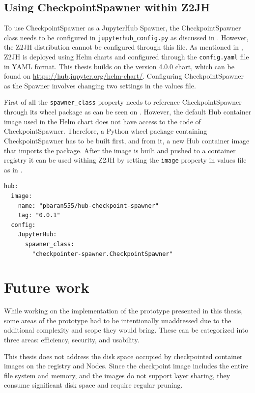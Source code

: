 \documentclass[
  digital,     %
  oneside,     %
  nosansbold,  %
  nocolorbold, %
  lof,         %
  nolot,         %
]{fithesis4}
\newenvironment{code}{\captionsetup{type=listing}}{}
\begin{document}
\section{Using CheckpointSpawner within Z2JH}
To use CheckpointSpawner as a JupyterHub Spawner, the CheckpointSpawner class needs to be configured in \texttt{jupyterhub\_config.py} as discussed in . However, the Z2JH distribution cannot be configured through this file. As mentioned in , Z2JH is deployed using Helm charts and configured through the \texttt{config.yaml} file in YAML format. This thesis builds on the version 4.0.0 chart, which can be found on \url{https://hub.jupyter.org/helm-chart/}. Configuring CheckpointSpawner as the Spawner involves changing two settings in the values file.

First of all the \texttt{spawner\_class} property needs to reference CheckpointSpawner through its wheel package as can be seen on . However, the default Hub container image used in the Helm chart does not have access to the code of CheckpointSpawner. Therefore, a Python wheel package containing CheckpointSpawner has to be built first, and from it, a new Hub container image that imports the package. After the image is built and pushed to a container registry it can be used withing Z2JH by setting the \texttt{image} property in values file as in .


\begin{code}
\label{lst:z2jh:values}
\begin{verbatim}
hub:
  image:
    name: "pbaran555/hub-checkpoint-spawner"
    tag: "0.0.1"
  config:
    JupyterHub:
      spawner_class: 
        "checkpointer-spawner.CheckpointSpawner"
\end{verbatim}
\end{code}




\chapter{Future work}
While working on the implementation of the prototype presented in this thesis, some areas of the prototype had to be intentionally unaddressed due to the additional complexity and scope they would bring. These can be categorized into three areas: efficiency, security, and usability.

This thesis does not address the disk space occupied by checkpointed container images on the registry and Nodes. Since the checkpoint image includes the entire file system and memory, and the images do not support layer sharing, they consume significant disk space and require regular pruning.
\end{document}
